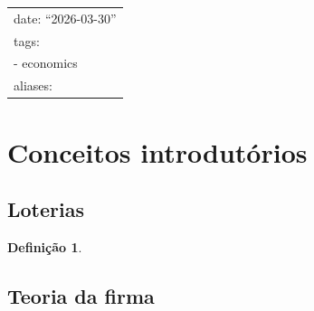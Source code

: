 \documentclass[12pt]{article}
\title{}
\author{}
\date{}
\numberwithin{equation}{section}
\theoremstyle{plain}
\theoremstyle{definition}
\newtheorem{definition}[theorem]{Definição}
\theoremstyle{remark}
\begin{document}
\maketitle

\begin{longtable}[]{@{}l@{}}
\toprule\noalign{}
\endhead
\bottomrule\noalign{}
\endlastfoot
date: ``2026-03-30'' \\
tags: \\
- economics \\
aliases: \\
\end{longtable}

\hypertarget{conceitos-introdutuxf3rios}{%
\section{Conceitos introdutórios}\label{conceitos-introdutuxf3rios}}

\hypertarget{loterias}{%
\subsection{Loterias}\label{loterias}}

\begin{definition}

\end{definition}

\hypertarget{teoria-da-firma}{%
\subsection{Teoria da firma}\label{teoria-da-firma}}
\end{document}

